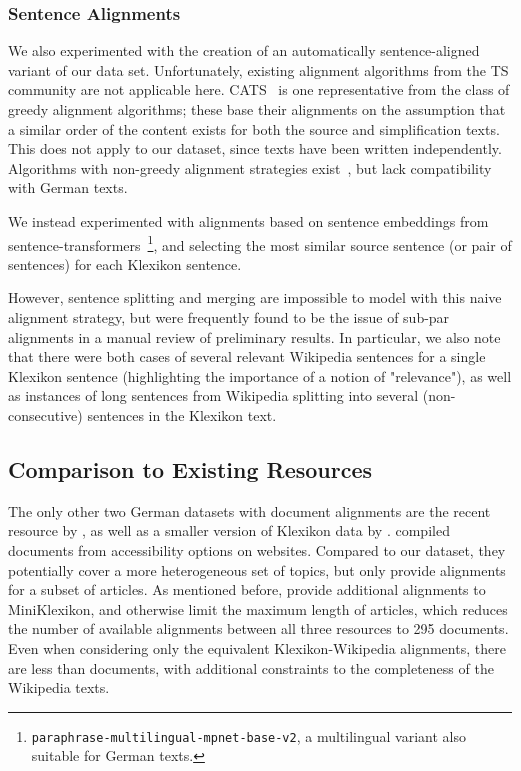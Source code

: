 \documentclass[10pt, a4paper]{article}
\begin{document}
\subsubsection{Sentence Alignments}
We also experimented with the creation of an automatically sentence-aligned variant of our data set.
Unfortunately, existing alignment algorithms from the TS community are not applicable here. CATS~\cite{stajner-etal-2018-cats} is one representative from the class of greedy alignment algorithms; these base their alignments on the assumption that a similar order of the content exists for both the source and simplification texts. This does not apply to our dataset, since texts have been written independently.
Algorithms with non-greedy alignment strategies exist~\cite{paetzold-etal-2017-massalign,jiang-etal-2020-neural}, but lack compatibility with German texts.

We instead experimented with alignments based on sentence embeddings from sentence-transformers~\cite{reimers-gurevych-2019-sentence}\footnote{\texttt{paraphrase-multilingual-mpnet-base-v2}, a multilingual variant also suitable for German texts.}, and selecting the most similar source sentence (or pair of sentences) for each Klexikon sentence.

However, sentence splitting and merging are impossible to model with this naive alignment strategy, but were frequently found to be the issue of sub-par alignments in a manual review of preliminary results. In particular, we also note that there were both cases of several relevant Wikipedia sentences for a single Klexikon sentence (highlighting the importance of a notion of "relevance"), as well as instances of long sentences from Wikipedia splitting into several (non-consecutive) sentences in the Klexikon text.





\subsection{Comparison to Existing Resources}
The only other two German datasets with document alignments are the recent resource by \cite{battisti-etal-2020-corpus}, as well as a smaller version of Klexikon data by \cite{hewett-stede-2021-automatically}. \cite{battisti-etal-2020-corpus} compiled documents from accessibility options on websites. Compared to our dataset, they potentially cover a more heterogeneous set of topics, but only provide alignments for a subset of articles.
As mentioned before, \cite{hewett-stede-2021-automatically} provide additional alignments to MiniKlexikon, and otherwise limit the maximum length of articles, which reduces the number of available alignments between all three resources to 295 documents. Even when considering only the equivalent Klexikon-Wikipedia alignments, there are less than  documents, with additional constraints to the completeness of the Wikipedia texts.
\end{document}
